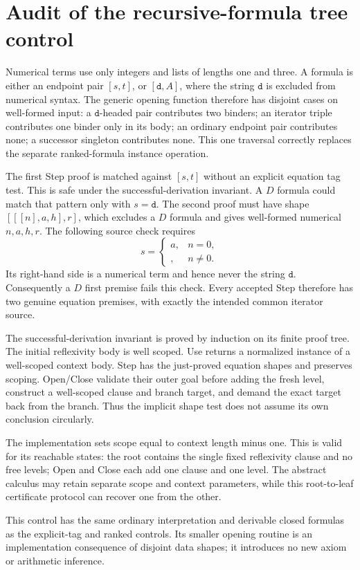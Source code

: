 \section{Audit of the recursive-formula tree control}
Numerical terms use only integers and lists of lengths one and three.
A formula is either an endpoint pair \([s,t]\), or
\([\mathtt d,A]\), where the string \(\mathtt d\) is excluded from
numerical syntax. The generic opening function therefore has disjoint
cases on well-formed input: a \(\mathtt d\)-headed pair contributes two
binders; an iterator triple contributes one binder only in its body;
an ordinary endpoint pair contributes none; a successor singleton
contributes none. This one traversal correctly replaces the separate
ranked-formula instance operation.

The first Step proof is matched against \([s,t]\) without an explicit
equation tag test. This is safe under the successful-derivation invariant.
A \(D\) formula could match that pattern only with \(s=\mathtt d\).
The second proof must have shape \([[[n],a,h],r]\), which excludes a
\(D\) formula and gives well-formed numerical \(n,a,h,r\).
The following source check requires
\[
 s=\begin{cases}a,&n=0,\\[n,a,h],&n\ne0.\end{cases}
\]
Its right-hand side is a numerical term and hence never the string
\(\mathtt d\). Consequently a \(D\) first premise fails this check.
Every accepted Step therefore has two genuine equation premises,
with exactly the intended common iterator source.

The successful-derivation invariant is proved by induction on its
finite proof tree. The initial reflexivity body is well scoped.
Use returns a normalized instance of a well-scoped context body.
Step has the just-proved equation shapes and preserves scoping.
Open/Close validate their outer goal before adding the fresh level,
construct a well-scoped clause and branch target, and demand the exact
target back from the branch. Thus the implicit shape test does not
assume its own conclusion circularly.

The implementation sets scope equal to context length minus one.
This is valid for its reachable states: the root contains the single
fixed reflexivity clause and no free levels; Open and Close each add
one clause and one level. The abstract calculus may retain separate
scope and context parameters, while this root-to-leaf certificate
protocol can recover one from the other.

This control has the same ordinary interpretation and derivable
closed formulas as the explicit-tag and ranked controls. Its smaller
opening routine is an implementation consequence of disjoint data
shapes; it introduces no new axiom or arithmetic inference.


